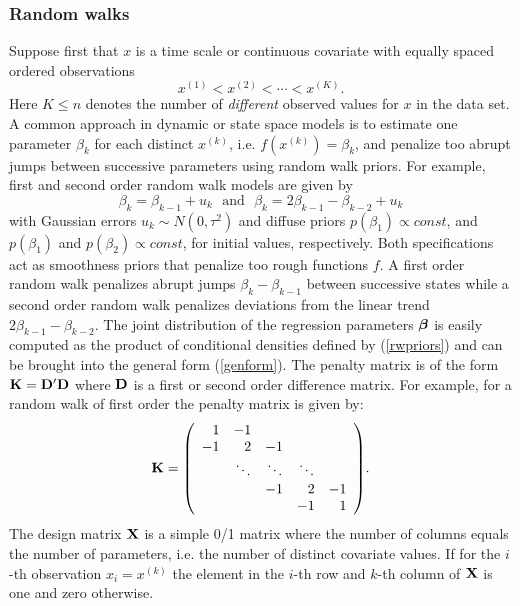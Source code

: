 \documentclass[11pt,a4paper,twoside]{bayesxarticle}
\begin{document}
\subsubsection{Random walks}

Suppose first that $x$ is a time scale or continuous covariate
with equally spaced ordered observations
$$
x^{(1)} < x^{(2)} < \cdots < x^{(K)}.
$$
Here $K \leq n$ denotes the number of {\em different} observed
values for $x$ in the data set. A common approach in dynamic or
state space models is to estimate one parameter $\beta_{k}$ for
each distinct $x^{(k)}$, i.e. $f(x^{(k)}) = \beta_{k}$, and
penalize too abrupt jumps between successive parameters using random
walk priors. For example, first and second order random walk models
are given by
\begin{equation}
\label{rwpriors}
\beta_{k}=\beta_{k-1}+u_{k}\,\,\,\,\mbox{and}\,\,\,\,\beta_{k}=2\beta_{k-1}-\beta_{k-2}+u_{k}
\end{equation}
with Gaussian errors $u_{k}\sim N(0,\tau^{2})$ and diffuse priors
$p(\beta_{1})\propto const$, and $p(\beta_{1})$ and
$p(\beta_{2})\propto const$, for initial values, respectively. Both
specifications act as smoothness priors that penalize too rough
functions $f$. A first order random walk penalizes abrupt jumps
$\beta_{k}-\beta_{k-1}$ between successive states while a second
order random walk penalizes deviations from the linear trend $2
\beta_{k-1}-\beta_{k-2}$. The joint distribution of the
regression parameters $\boldsymbol{\beta}$ is easily computed as the product of
conditional densities defined by (\ref{rwpriors}) and can be brought
into the general form (\ref{genform}). The penalty matrix is of the
form $\mathbf{K}=\mathbf{D}'\mathbf{D}$ where $\mathbf{D}$ is a first or second order difference
matrix. For example, for a random walk of first order the penalty
matrix is given by:
$$
\Kvec = {\footnotesize \left(
\begin{array}{rrrrr}
 1 & -1 & & &  \\
-1 & 2 & -1 & & \\
 &  \ddots & \ddots & \ddots &  \\
 & & -1 & 2 & -1 \\
  & & & -1 & 1
\end{array}
\right) }.
$$
The design matrix $\mathbf{X}$ is a simple 0/1 matrix where the number of
columns equals the number of parameters, i.e. the number of distinct
covariate values. If for the $i$-th observation $x_{i}=x^{(k)}$
the element in the $i$-th row and $k$-th column of $\mathbf{X}$ is one and
zero otherwise.
\end{document}
